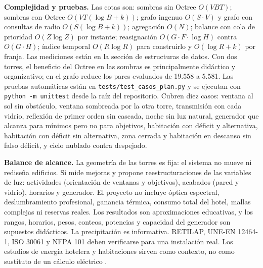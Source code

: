 \documentclass[12pt,a4paper]{article}
\newcommand{\codigo}[1]{\texttt{#1}}
\begin{document}
\textbf{Complejidad y pruebas.} Las cotas son: sombras sin Octree $O(VBT)$; sombras con Octree $O(VT(\log B+k))$; grafo ingenuo $O(S\cdot V)$ y grafo con consultas de radio $O(S(\log B+k))$; agregación $O(N)$; balance con cola de prioridad $O(Z\log Z)$ por instante; reasignación $O(G\cdot F\cdot\log H)$ contra $O(G\cdot H)$; índice temporal $O(R\log R)$ para construirlo y $O(\log R+k)$ por franja. Las mediciones están en la sección de estructuras de datos. Con dos torres, el beneficio del Octree en las sombras es principalmente didáctico y organizativo; en el grafo reduce los pares evaluados de 19.558 a 5.581. Las pruebas automáticas están en \codigo{tests/test\_casos\_plan.py} y se ejecutan con \codigo{python -m unittest} desde la raíz del repositorio. Cubren diez casos: ventana al sol sin obstáculo, ventana sombreada por la otra torre, transmisión con cada vidrio, reflexión de primer orden sin cascada, noche sin luz natural, generador que alcanza para mínimos pero no para objetivos, habitación con déficit y alternativa, habitación con déficit sin alternativa, zona cerrada y habitación en descanso sin falso déficit, y cielo nublado contra despejado.

\textbf{Balance de alcance.} La geometría de las torres es fija: el sistema no mueve ni rediseña edificios. Sí mide mejoras y propone reestructuraciones de las variables de luz: actividades (orientación de ventanas y objetivos), acabados (pared y vidrio), horarios y generador. El proyecto no incluye óptica espectral, deslumbramiento profesional, ganancia térmica, consumo total del hotel, mallas complejas ni reservas reales. Los resultados son aproximaciones educativas, y los rangos, horarios, pesos, conteos, potencias y capacidad del generador son supuestos didácticos. La precipitación es informativa. RETILAP, UNE-EN 12464-1, ISO 30061 y NFPA 101 deben verificarse para una instalación real. Los estudios de energía hotelera y habitaciones sirven como contexto, no como sustituto de un cálculo eléctrico \cite{hotelReview,lbnlHotelLighting,energyStarEui}.
\end{document}
